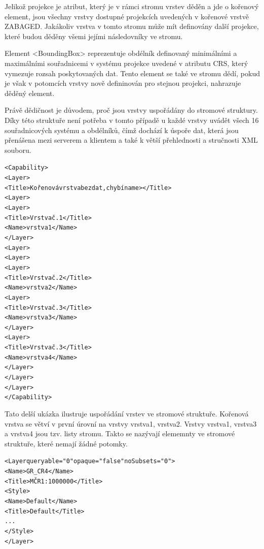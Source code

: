 \documentclass[a4paper,12pt]{article}
\begin{document}
Jelikož projekce je atribut, který je v rámci stromu vrstev děděn a jde o kořenový element, jsou všechny vrstvy dostupné projekcích uvedených v kořenové vrstvě ZABAGED.
Jakákoliv vrstva v tomto stromu může mít definovány další projekce, které budou děděny všemi jejími následovníky ve stromu. 

Element <BoundingBox> reprezentuje obdélník definovaný minimálními a maximálními souřadnicemi v systému projekce uvedené v atributu CRS, který vymezuje rozsah poskytovaných dat. 
Tento element se také ve stromu dědí, pokud je však v potomcích vrstvy nově defininován pro stejnou projekci, nahrazuje děděný element.

 Právě dědičnost je důvodem, proč jsou vrstvy uspořádány do stromové struktury. Díky této struktuře není potřeba v tomto případě u každé vrstvy
uvádět všech 16 souřadnicových systému a obdélníků, čímž dochází k úspoře dat, která jsou přenášena mezi serverem a klientem a také k větší přehlednosti a stručnosti XML souboru.

\newpage

\begin{alltt}\footnotesize
<Capability>
  <Layer>
    <Title>Kořenová vrstva bez dat, chybí name></Title>
    <Layer>
      <Layer>
        <Title>Vrstva č. 1</Title>
        <Name>vrstva1</Name>
      </Layer>
    <Layer>
    <Layer>
      <Layer>
        <Title>Vrstva č. 2</Title>
        <Name>vrstva2</Name>
        <Layer>
          <Title>Vrstva č. 3</Title>
          <Name>vrstva3</Name>
        </Layer>
        <Layer>
          <Title>Vrstva č. 3</Title>
          <Name>vrstva4</Name>
        </Layer>
      </Layer>
    </Layer>
</Capability>
\end{alltt}



Tato delší ukázka ilustruje uspořádání vrstev ve stromové struktuře. Kořenová vrstva se větví v první úrovní  na vrstvy vrstva1, 
vrstva2. Vrstvy vrstva1, vrstva3 a vrstva4 jsou tzv. listy stromu. Takto se nazývají elememnty ve stromové struktuře, které nemají 
žádné potomky. 



\begin{alltt}\footnotesize

<Layer queryable="0" opaque="false" noSubsets="0">
    <Name>GR_CR4</Name>
    <Title>MČR 1 : 1 000 000</Title>
    <Style>
        <Name>Default</Name>
        <Title>Default</Title>
          ...
    </Style>
</Layer>
\end{alltt}
\end{document}
